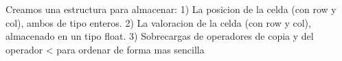 
Creamos una estructura para almacenar:
1) La posicion de la celda (con row y col), ambos de tipo enteros.
2) La valoracion de la celda (con row y col), almacenado en un tipo float.
3) Sobrecargas de operadores de copia y del operador < para ordenar de forma mas sencilla

